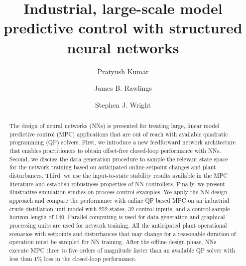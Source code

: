 \documentclass[preprint,5p, twocolumn, authoryear]{elsarticle}
\begin{document}
\begin{frontmatter}


\title{Industrial, large-scale model predictive control 
with structured neural networks}

\author[label1]{Pratyush Kumar}

\author[label1]{James B. Rawlings}

\author[label2]{Stephen J. Wright}

\address[label1]{Department of Chemical Engineering, University of California, Santa Barbara, CA 93106, United States}
\address[label2]{Computer Sciences Department, University of Wisconsin-Madison, Madison, WI 53706, United States}

\begin{abstract}
The design of neural networks (NNs) is presented 
for treating large, linear model predictive control (MPC) applications that 
are out of reach with available quadratic programming (QP)
solvers. First, we introduce a new feedforward
network architecture that enables practitioners to 
obtain offset-free closed-loop performance with NNs.
Second, we discuss the data generation procedure 
to sample the relevant state space for the network 
training based on anticipated online setpoint changes and
plant disturbances. Third, we use the 
input-to-state stability results 
available in the MPC literature
and establish robustness 
properties of NN controllers.
Finally, we present illustrative
simulation studies on 
process control examples. 
We apply the NN design approach
and compare the performance with online QP based MPC on an industrial crude
distillation unit model with 252 states, 32 control inputs, 
and a control-sample horizon length of 140. Parallel computing 
is used for data generation and graphical processing units are used for
network training. All the anticipated plant operational scenarios 
with setpoints and disturbances that may change for 
a reasonable duration of operation must be sampled for NN training.
After the offline design phase, 
NNs execute MPC 
three to five orders of magnitude faster
than an available QP solver with less than $1\%$
loss in the closed-loop performance.
\end{abstract}


\end{frontmatter}
\end{document}
